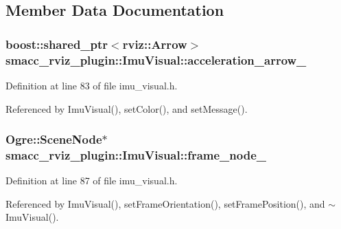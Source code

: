 \subsection{Member Data Documentation}
\subsubsection[{\texorpdfstring{acceleration\+\_\+arrow\+\_\+}{acceleration_arrow_}}]{\setlength{\rightskip}{0pt plus 5cm}boost\+::shared\+\_\+ptr$<$rviz\+::\+Arrow$>$ smacc\+\_\+rviz\+\_\+plugin\+::\+Imu\+Visual\+::acceleration\+\_\+arrow\+\_\+\hspace{0.3cm}{\ttfamily [private]}}\hypertarget{classsmacc__rviz__plugin_1_1ImuVisual_abead7d3f3c66b20bba8123a145b121b0}{}\label{classsmacc__rviz__plugin_1_1ImuVisual_abead7d3f3c66b20bba8123a145b121b0}


Definition at line 83 of file imu\+\_\+visual.\+h.



Referenced by Imu\+Visual(), set\+Color(), and set\+Message().

\subsubsection[{\texorpdfstring{frame\+\_\+node\+\_\+}{frame_node_}}]{\setlength{\rightskip}{0pt plus 5cm}Ogre\+::\+Scene\+Node$\ast$ smacc\+\_\+rviz\+\_\+plugin\+::\+Imu\+Visual\+::frame\+\_\+node\+\_\+\hspace{0.3cm}{\ttfamily [private]}}\hypertarget{classsmacc__rviz__plugin_1_1ImuVisual_ae41316c00ac89e1e0ee0adf62da10841}{}\label{classsmacc__rviz__plugin_1_1ImuVisual_ae41316c00ac89e1e0ee0adf62da10841}


Definition at line 87 of file imu\+\_\+visual.\+h.



Referenced by Imu\+Visual(), set\+Frame\+Orientation(), set\+Frame\+Position(), and $\sim$\+Imu\+Visual().

